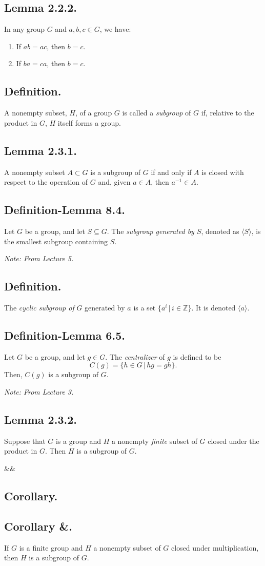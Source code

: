 \documentclass{article}
\newenvironment{lemma}[1]{\subsection*{Lemma #1.}}{}
\newenvironment{defn}{\subsection*{Definition.}}{}
\newenvironment{defnlemma}[1]{\subsection*{Definition-Lemma #1.}}{}
\newenvironment{corollary}[1]{
    \def\temp{#1}\def\null{&}\ifx\temp\null
        \subsection*{Corollary.}
    \else
        \subsection*{Corollary #1.}
    \fi
    
}{}
\newcommand*{\Z}{\mathbb{Z}}
\begin{document}
\begin{lemma}{2.2.2}
    In any group $G$ and $a, b, c \in G$, we have:
    \begin{enumerate}[label=(\alph*)]
        \item If $ab = ac$, then $b = c$.
        \item If $ba = ca$, then $b = c$.
    \end{enumerate}
\end{lemma}

\begin{defn}
    A nonempty subset, $H$, of a group $G$ is called a \textit{subgroup} of $G$ if, relative to the product in $G$, $H$ itself forms a group.
\end{defn}

\begin{lemma}{2.3.1}
    A nonempty subset $A \subset G$ is a subgroup of $G$ if and only if $A$ is closed with respect to the operation of $G$ and, given $a \in A$, then $a^{-1} \in A$.
\end{lemma}

\begin{defnlemma}{8.4}
    Let $G$ be a group, and let $S \subseteq G$. The \textit{subgroup generated by $S$}, denoted as $\langle S \rangle $, is the smallest subgroup containing $S$.

    \textit{Note: From Lecture 5.}
\end{defnlemma}

\begin{defn}
    The \textit{cyclic subgroup of} $G$ generated by $a$ is a set $\{a^i \, | \, i \in \Z\}$. It is denoted $\langle a \rangle$.
\end{defn}

\begin{defnlemma}{6.5}
    Let $G$ be a group, and let $g \in G$. The \textit{centralizer} of $g$ is defined to be
    \[
        C(g) = \{h \in G \, | \, hg = gh\}.  
    \]
    Then, $C(g)$ is a subgroup of $G$.

    \textit{Note: From Lecture 3.}
\end{defnlemma}

\begin{lemma}{2.3.2}
    Suppose that $G$ is a group and $H$ a nonempty \textit{finite} subset of $G$ closed under the product in $G$. Then $H$ is a subgroup of $G$.
\end{lemma}

\begin{corollary}{&}
    If $G$ is a finite group and $H$ a nonempty subset of $G$ closed under multiplication, then $H$ is a subgroup of $G$.
\end{corollary}
\end{document}
